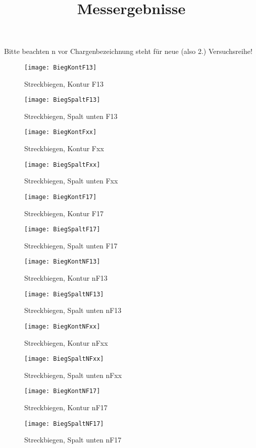 \documentclass[12pt,a4paper,parskip]{scrartcl}
\begin{document}
\title{Messergebnisse}
\maketitle
Bitte beachten n vor Chargenbezeichnung steht für neue (also 2.) Versuchsreihe!
\newpage
\begin{figure}[H]
\centering
\texttt{[image: BiegKontF13]}
\caption{Streckbiegen, Kontur F13}
\end{figure}
\begin{figure}[H]
\centering
\texttt{[image: BiegSpaltF13]}
\caption{Streckbiegen, Spalt unten F13}
\end{figure}
\begin{figure}[H]
\centering
\texttt{[image: BiegKontFxx]}
\caption{Streckbiegen, Kontur Fxx}
\end{figure}
\begin{figure}[H]
\centering
\texttt{[image: BiegSpaltFxx]}
\caption{Streckbiegen, Spalt unten Fxx}
\end{figure}
\begin{figure}[H]
\centering
\texttt{[image: BiegKontF17]}
\caption{Streckbiegen, Kontur F17}
\end{figure}
\begin{figure}[H]
\centering
\texttt{[image: BiegSpaltF17]}
\caption{Streckbiegen, Spalt unten F17}
\end{figure}
\begin{figure}[H]
\centering
\texttt{[image: BiegKontNF13]}
\caption{Streckbiegen, Kontur nF13}
\end{figure}
\begin{figure}[H]
\centering
\texttt{[image: BiegSpaltNF13]}
\caption{Streckbiegen, Spalt unten nF13}
\end{figure}
\begin{figure}[H]
\centering
\texttt{[image: BiegKontNFxx]}
\caption{Streckbiegen, Kontur nFxx}
\end{figure}
\begin{figure}[H]
\centering
\texttt{[image: BiegSpaltNFxx]}
\caption{Streckbiegen, Spalt unten nFxx}
\end{figure}
\begin{figure}[H]
\centering
\texttt{[image: BiegKontNF17]}
\caption{Streckbiegen, Kontur nF17}
\end{figure}
\begin{figure}[H]
\centering
\texttt{[image: BiegSpaltNF17]}
\caption{Streckbiegen, Spalt unten nF17}
\end{figure}
\end{document}
